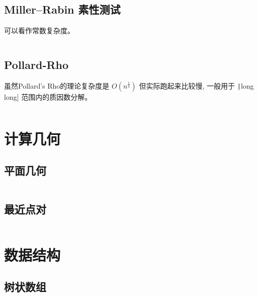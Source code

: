 \documentclass[a4paper, twoside]{article}
\begin{document}
\subsection{Miller–Rabin 素性测试}
可以看作常数复杂度。
\inputminted{cpp}{../src/数论/Miller–Rabin素性测试.cpp}

\subsection{Pollard-Rho}
虽然Pollard's Rho的理论复杂度是 $O(n ^ {\frac{1}{4}})$ 但实际跑起来比较慢, 一般用于 \texttt|long long| 范围内的质因数分解。
\inputminted{cpp}{../src/数论/Pollard-Rho.cpp}



\newpage
\section{计算几何}
\subsection{平面几何}
\inputminted{cpp}{../src/计算几何/平面几何.cpp}


\subsection{最近点对}
\inputminted{cpp}{../src/计算几何/最近点对.cpp}


\newpage
\section{数据结构}
\subsection{树状数组}
\inputminted{cpp}{../src/数据结构/树状数组.cpp}
\end{document}
